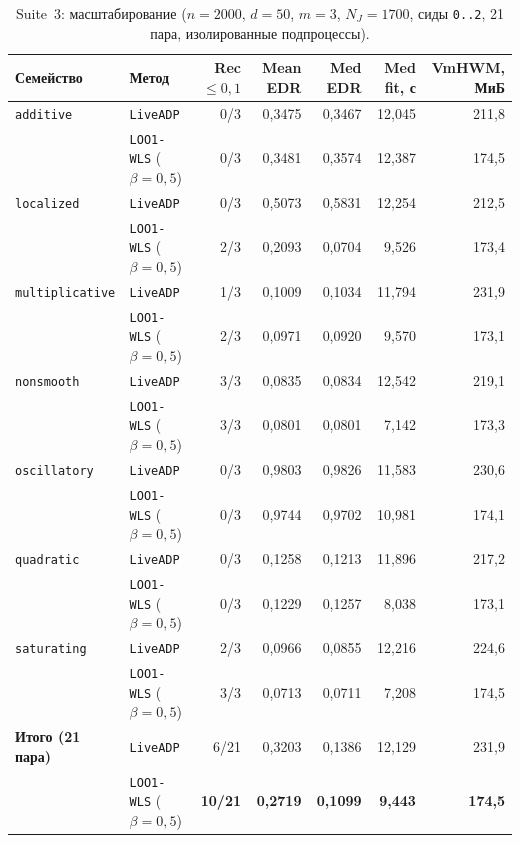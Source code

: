 \documentclass[11pt,a4paper]{article}
\numberwithin{equation}{section}
\theoremstyle{definition}
\theoremstyle{remark}
\begin{document}
\begin{table}[htbp]
\centering
\caption{Suite~3: масштабирование ($n=2000$, $d=50$, $m=3$, $N_J=1700$, сиды \texttt{0..2}, 21 пара, изолированные подпроцессы).}
\label{tab:suite3}
\footnotesize
\setlength{\tabcolsep}{5pt}
\begin{tabular}{@{}llrrrrr@{}}
\toprule
Семейство & Метод & Rec $\le 0{,}1$ & Mean EDR & Med EDR & Med fit, с & VmHWM, МиБ \\
\midrule
\texttt{additive}       & \texttt{LiveADP}              & 0/3 & 0,3475 & 0,3467 & 12,045 & 211,8 \\
                        & \texttt{LOO1-WLS} ($\beta=0{,}5$) & 0/3 & 0,3481 & 0,3574 & 12,387 & 174,5 \\
\texttt{localized}      & \texttt{LiveADP}              & 0/3 & 0,5073 & 0,5831 & 12,254 & 212,5 \\
                        & \texttt{LOO1-WLS} ($\beta=0{,}5$) & 2/3 & 0,2093 & 0,0704 &  9,526 & 173,4 \\
\texttt{multiplicative} & \texttt{LiveADP}              & 1/3 & 0,1009 & 0,1034 & 11,794 & 231,9 \\
                        & \texttt{LOO1-WLS} ($\beta=0{,}5$) & 2/3 & 0,0971 & 0,0920 &  9,570 & 173,1 \\
\texttt{nonsmooth}      & \texttt{LiveADP}              & 3/3 & 0,0835 & 0,0834 & 12,542 & 219,1 \\
                        & \texttt{LOO1-WLS} ($\beta=0{,}5$) & 3/3 & 0,0801 & 0,0801 &  7,142 & 173,3 \\
\texttt{oscillatory}    & \texttt{LiveADP}              & 0/3 & 0,9803 & 0,9826 & 11,583 & 230,6 \\
                        & \texttt{LOO1-WLS} ($\beta=0{,}5$) & 0/3 & 0,9744 & 0,9702 & 10,981 & 174,1 \\
\texttt{quadratic}      & \texttt{LiveADP}              & 0/3 & 0,1258 & 0,1213 & 11,896 & 217,2 \\
                        & \texttt{LOO1-WLS} ($\beta=0{,}5$) & 0/3 & 0,1229 & 0,1257 &  8,038 & 173,1 \\
\texttt{saturating}     & \texttt{LiveADP}              & 2/3 & 0,0966 & 0,0855 & 12,216 & 224,6 \\
                        & \texttt{LOO1-WLS} ($\beta=0{,}5$) & 3/3 & 0,0713 & 0,0711 &  7,208 & 174,5 \\
\midrule
\textbf{Итого (21 пара)} & \texttt{LiveADP}             &  6/21 & 0,3203 & 0,1386 & 12,129 & 231,9 \\
                         & \texttt{LOO1-WLS} ($\beta=0{,}5$) & \textbf{10/21} & \textbf{0,2719} & \textbf{0,1099} & \textbf{9,443} & \textbf{174,5} \\
\bottomrule
\end{tabular}
\end{table}
\end{document}
